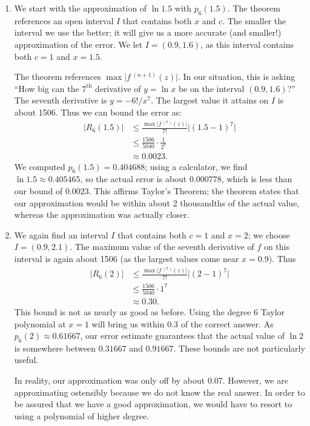 \begin{solution}
{\begin{enumerate}
\item	We start with the approximation of $\ln 1.5$ with $p_6(1.5)$. The theorem references an open interval $I$ that contains both $x$ and $c$. The smaller the interval we use the better; it will give us a more accurate (and smaller!) approximation of the error. We let $I = (0.9,1.6)$, as this interval contains both $c=1$ and $x=1.5$. 

The theorem references $\max\big|f\,^{(n+1)}(z)\big|$. In our situation, this is asking ``How big can the $7^\text{th}$ derivative of $y=\ln x$ be on the interval $(0.9,1.6)$?'' The seventh derivative is $y = -6!/x^7$. The largest value it attains on $I$ is about 1506. Thus we can bound the error as:
\begin{align*}
\big|R_6(1.5)\big| &\leq \frac{\max\big|f\,^{(7)}(z)\big|}{7!}\big|(1.5-1)^7\big|\\
					&\leq \frac{1506}{5040}\cdot\frac1{2^7}\\
					&\approx 0.0023.
\end{align*}
\noindent%
We computed $p_6(1.5) = 0.404688$; using a calculator, we find $\ln 1.5 \approx 0.405465$, so the actual error is about $0.000778$, which is less than our bound of $0.0023$. This affirms Taylor's Theorem; the theorem states that our approximation would be within about 2 thousandths of the actual value, whereas the approximation was actually closer.

\item		We again find an interval $I$ that contains both $c=1$ and $x=2$; we choose $I = (0.9,2.1)$. The maximum value of the seventh derivative of $f$ on this interval is again about 1506 (as the largest values come near $x=0.9$). Thus 
\begin{align*}
\big| R_6(2)\big| &\leq \frac{\max\big|f\,^{(7)}(z)\big|}{7!}\big|(2-1)^7\big|\\
					&\leq \frac{1506}{5040}\cdot1^7\\
					&\approx 0.30.
\end{align*}
This bound is not as nearly as good as before. Using the degree 6 Taylor polynomial at $x =1$ will bring us within 0.3 of the correct answer. As $p_6(2)\approx 0.61667$, our error estimate guarantees that the actual value of $\ln 2$ is somewhere between $0.31667$ and $0.91667$. These bounds are not particularly useful.

In reality, our approximation was only off by about 0.07. However, we are approximating ostensibly because we do not know the real answer. In order to be assured that we have a good approximation, we would have to resort to using a polynomial of higher degree.
\end{enumerate}
}
\end{solution}







